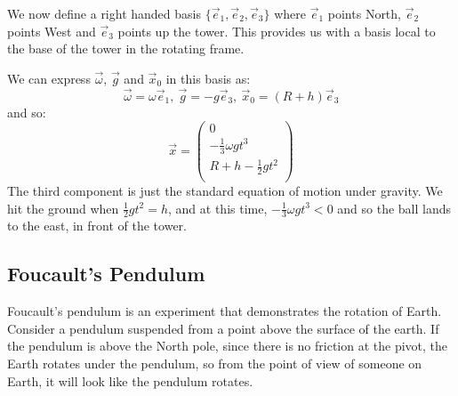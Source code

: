 \documentclass[../main.tex]{subfiles}
\begin{document}
\begin{example}
  We now define a right handed basis $\{\vec{e}_1, \vec{e}_2, \vec{e}_3\}$ where $\vec{e}_1$ points North, $\vec{e}_2$ points West and $\vec{e}_3$ points up the tower.
  This provides us with a basis local to the base of the tower in the rotating frame.

  We can express $\vec{\omega}$, $\vec{g}$ and $\vec{x}_0$ in this basis as:
  \[
    \vec{\omega} = \omega \vec{e}_1,\ \vec{g} = - g \vec{e}_3,\ \vec{x}_0 = (R + h)\vec{e}_3
  \]
  and so:
  \[
    \vec{x} = \begin{pmatrix}
    0 \\
    -\frac{1}{3}\omega g t^3 \\
    R + h - \frac{1}{2}gt^2 \\
    \end{pmatrix}
  \]
  The third component is just the standard equation of motion under gravity.
  We hit the ground when $\frac{1}{2}gt^2 = h$, and at this time, $-\frac{1}{3} \omega g t^3 < 0$ and so the ball lands to the east, in front of the tower.
\end{example}
\subsection{Foucault's Pendulum}
Foucault's pendulum is an experiment that demonstrates the rotation of Earth.
Consider a pendulum suspended from a point above the surface of the earth.
If the pendulum is above the North pole, since there is no friction at the pivot, the Earth rotates under the pendulum, so from the point of view of someone on Earth, it will look like the pendulum rotates.
\end{document}

